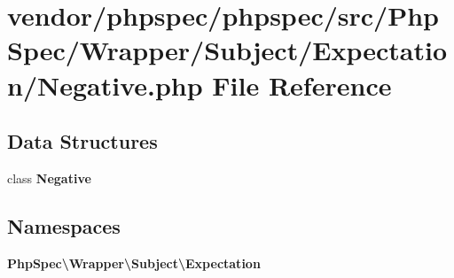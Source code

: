 \section{vendor/phpspec/phpspec/src/\+Php\+Spec/\+Wrapper/\+Subject/\+Expectation/\+Negative.php File Reference}
\label{_negative_8php}
\subsection*{Data Structures}
\begin{DoxyCompactItemize}
\item 
class {\bf Negative}
\end{DoxyCompactItemize}
\subsection*{Namespaces}
\begin{DoxyCompactItemize}
\item 
 {\bf Php\+Spec\textbackslash{}\+Wrapper\textbackslash{}\+Subject\textbackslash{}\+Expectation}
\end{DoxyCompactItemize}

